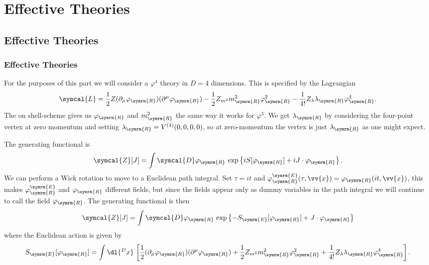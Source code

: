\documentclass[fleqn]{NotesClass}
\newcommand{\lagrangianDensity}{\symcal{L}}
\newcommand{\DL}[1]{\symcal{D}#1}
\newcommand{\renormalised}{\symrm{R}}
\begin{document}
    \part{Effective Theories}
    \chapter{Effective Theories}
    \section{Effective Theories}
    For the purposes of this part we will consider a \(\varphi^4\) theory in \(D = 4\) dimensions.
    This is specified by the Lagrangian
    \begin{equation}
        \lagrangianDensity = \frac{1}{2}Z(\partial_\mu \varphi_{\renormalised}) (\partial^\mu \varphi_{\renormalised}) - \frac{1}{2} Z_{m^2} m_{\renormalised}^2 \varphi_{\renormalised}^2 - \frac{1}{4!} Z_\lambda \lambda_{\renormalised} \varphi_{\renormalised}^4.
    \end{equation}
    The on shell-scheme gives us \(\varphi_{\renormalised}\) and \(m_{\renormalised}^2\) the same way it works for \(\varphi^3\).
    We get \(\lambda_{\renormalised}\) by considering the four-point vertex at zero momentum and setting \(\lambda_{\renormalised} = V^{(4)}(0, 0, 0, 0)\), so at zero-momentum the vertex is just \(\lambda_{\renormalised}\) as one might expect.
    
    The generating functional is
    \begin{equation}
        \symcal{Z}[J] = \int \DL{\varphi_{\renormalised}} \, \exp\left\{ iS[\varphi_{\renormalised}] + i J \cdot \varphi_{\renormalised} \right\}.
    \end{equation}
    We can perform a Wick rotation to move to a Euclidean path integral.
    Set \(\tau = it\) and \(\varphi_{\renormalised}^{\symrm{E}}(\tau, \vv{x}) = \varphi_{\renormalised}(it, \vv{x})\), this makes \(\varphi_{\renormalised}^{\symrm{E}}\) and \(\varphi_{\renormalised}\) different fields, but since the fields appear only as dummy variables in the path integral we will continue to call the field \(\varphi_{\renormalised}\).
    The generating functional is then
    \begin{equation}
        \symcal{Z}[J] = \int \DL{\varphi_{\renormalised}} \, \exp\left\{ -S_{\symrm{E}}[\varphi_{\renormalised}] + J \cdot \varphi_{\renormalised} \right\}
    \end{equation}
    where the Euclidean action is given by
    \begin{equation}
        S_{\symrm{E}}[\varphi_{\renormalised}] = \int \dl{^Dx} \, \left[ \frac{1}{2}(\partial_\mu \varphi_{\renormalised})(\partial^\mu \varphi_{\renormalised}) + \frac{1}{2}Z_{m^2}m_{\renormalised}^2 \varphi_{\renormalised}^2 + \frac{1}{4!}Z_\lambda \lambda_{\renormalised} \varphi_{\renormalised}^4 \right].
    \end{equation}
    
\end{document}
